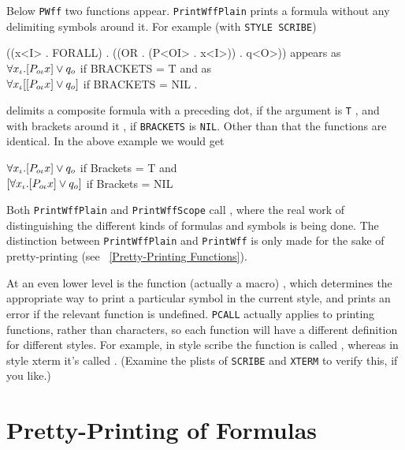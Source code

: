 Below {\tt PWff} two functions appear.
{\tt PrintWffPlain} prints a formula without any delimiting symbols
around it.  For example (with {\tt STYLE SCRIBE})  
\begin{Example}
((x<I> . FORALL) . ((OR . (P<OI> . x<I>)) . q<O>))  appears as \\
$\forall x_\iota . [P_{o\iota} x] \lor q_o$ if BRACKETS = T and as \\
$\forall x_\iota [[P_{o\iota} x] \lor q_o]$ if BRACKETS = NIL .
\end{Example}
 delimits a composite formula with a preceding
dot, if the argument  is {\tt T} , and with brackets
around it , if {\tt BRACKETS} is {\tt NIL}.  Other than that the functions are
identical.  In the above example we would get
\begin{Example}
$\forall x_\iota . [P_{o\iota} x] \lor q_o$ if Brackets = T and \\
$[\forall x_\iota . [P_{o\iota} x] \lor q_o]$ if Brackets = NIL
\end{Example}
Both {\tt PrintWffPlain} and {\tt PrintWffScope} call ,
where the real work of distinguishing the different kinds of formulas
and symbols is being done.  The distinction between {\tt PrintWffPlain} and 
{\tt PrintWff} is only made for the sake of pretty-printing (see 
~\ref{Pretty-Printing Functions}).

At an even lower level is the function (actually a macro) ,
which determines the appropriate way to print a particular symbol in the 
current style, and prints an error if the relevant function is undefined.
{\tt PCALL} actually applies to printing functions, rather than characters, so
each function will have a different definition for different styles. For example,
in style scribe the  function is called , 
whereas in style xterm it's called . (Examine
the plists of {\tt SCRIBE} and {\tt XTERM} to verify this, if you like.)

\section{Pretty-Printing of Formulas}\label{Pretty-Printing}

